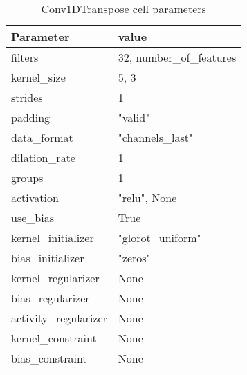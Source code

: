 \begin{table}[h]
  \centering
  \caption{Conv1DTranspose cell parameters}
  \label{table:conv1dtranspose-cell-parameters}
  \begin{tabular}{|l|l|}\hline
    Parameter             & value                    \\ \hline
    \hline
    filters               & 32, number\_of\_features \\ \hline
    kernel\_size          & 5, 3                     \\ \hline
    strides               & 1                        \\ \hline
    padding               & "valid"                  \\ \hline
    data\_format          & "channels\_last"         \\ \hline
    dilation\_rate        & 1                        \\ \hline
    groups                & 1                        \\ \hline
    activation            & "relu", None             \\ \hline
    use\_bias             & True                     \\ \hline
    kernel\_initializer   & "glorot\_uniform"        \\ \hline
    bias\_initializer     & "zeros"                  \\ \hline
    kernel\_regularizer   & None                     \\ \hline
    bias\_regularizer     & None                     \\ \hline
    activity\_regularizer & None                     \\ \hline
    kernel\_constraint    & None                     \\ \hline
    bias\_constraint      & None                     \\ \hline
    \hline
  \end{tabular}
\end{table}



